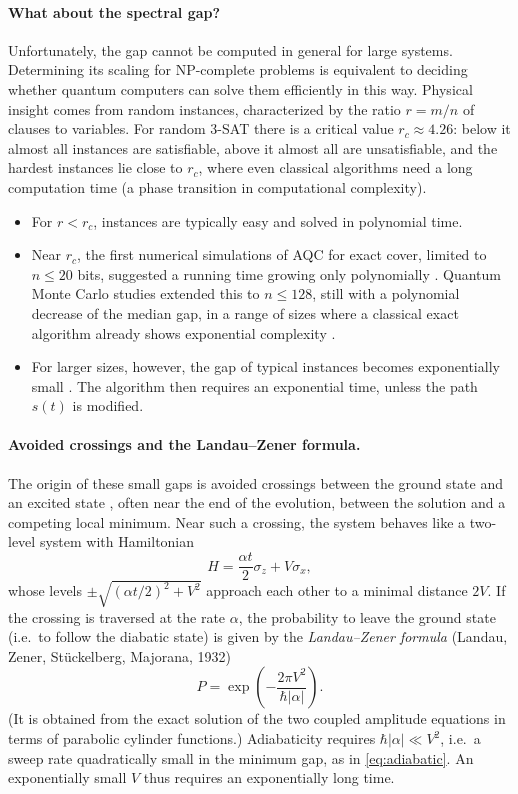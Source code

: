 \paragraph{What about the spectral gap?} Unfortunately, the gap cannot be computed in general for large systems. Determining its scaling for NP-complete problems is equivalent to deciding whether quantum computers can solve them
efficiently in this way. Physical insight comes from random instances, characterized by the ratio $r=m/n$ of clauses to variables. For random 3-SAT there is a critical value $r_c\approx4.26$: below it almost all instances are
satisfiable, above it almost all are unsatisfiable, and the hardest instances lie close to $r_c$, where even classical algorithms need a long computation time (a phase transition in computational complexity).
\begin{itemize}
  \item For $r<r_c$, instances are typically easy and solved in polynomial time.
  \item Near $r_c$, the first numerical simulations of AQC for exact cover, limited to $n\le20$ bits, suggested a running time growing only polynomially \cite{Farhi2001}. Quantum Monte Carlo studies extended this to $n\le128$, still with a
  polynomial decrease of the median gap, in a range of sizes where a classical exact algorithm already shows exponential complexity \cite{Young2008}.
  \item For larger sizes, however, the gap of typical instances becomes exponentially small \cite{HenYoung2011}. The algorithm then requires an exponential time, unless the path $s(t)$ is modified.
\end{itemize}

\paragraph{Avoided crossings and the Landau--Zener formula.} The origin of these small gaps is avoided crossings between the ground state and an excited state \cite{Altshuler2010}, often near the end of the evolution, between the solution and
a competing local minimum. Near such a crossing, the system behaves like a two-level system with Hamiltonian
\begin{equation}
  H=\frac{\alpha t}2\sigma_z+V\sigma_x,
\end{equation}
whose levels $\pm\sqrt{(\alpha t/2)^2+V^2}$ approach each other to a minimal distance $2V$. If the crossing is traversed at the rate $\alpha$, the probability to leave the ground state (i.e.\ to follow the diabatic state) is given by the
\emph{Landau--Zener formula} (Landau, Zener, Stückelberg, Majorana, 1932)
\begin{equation}
  P=\exp\left(-\frac{2\pi V^2}{\hbar|\alpha|}\right).
\end{equation}
(It is obtained from the exact solution of the two coupled amplitude equations in terms of parabolic cylinder functions.) Adiabaticity requires $\hbar|\alpha|\ll V^2$, i.e.\ a sweep rate quadratically small in the minimum gap, as in
\cref{eq:adiabatic}. An exponentially small $V$ thus requires an exponentially long time.

